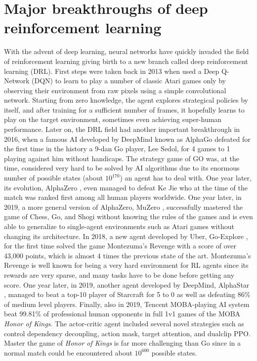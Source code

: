 \section{Major breakthroughs of deep reinforcement learning}
With the advent of deep learning, neural networks have quickly invaded the field of reinforcement learning giving birth to a new branch called deep reinforcement learning (DRL). First steps were taken back in 2013 when \cite{mnih2013playing} used a Deep Q-Network (DQN) to learn to play a number of classic Atari games only by observing their environment from raw pixels using a simple convolutional network. Starting from zero knowledge, the agent explores strategical policies by itself, and after training for a sufficient number of frames, it hopefully learns to play on the target environment, sometimes even achieving super-human performance. Later on, the DRL field had another important breakthrough in 2016, when a famous AI developed by DeepMind known as AlphaGo \cite{alphago} defeated for the first time in the history a 9-dan Go player, Lee Sedol, for 4 games to 1 playing against him without handicaps. The strategy game of GO was, at the time, considered very hard to be solved by AI algorithms due to its enormous number of possible states (about \(10^{170}\)) an agent has to deal with. One year later, its evolution, AlphaZero \cite{silver2017mastering}, even managed to defeat Ke Jie who at the time of the match was ranked first among all human players worldwide. One year later, in 2019, a more general version of AlphaZero, MuZero \cite{Schrittwieser_2020}, successfully mastered the game of Chess, Go, and Shogi without knowing the rules of the games and is even able to generalize to single-agent environments such as Atari games without changing its architecture. In 2018, a new agent developed by Uber, Go-Explore \cite{ecoffet2019goexplore}, for the first time solved the game Montezuma’s Revenge with a score of over 43,000 points, which is almost 4 times the previous state of the art. Montezuma’s Revenge is well known for being a very hard environment for RL agents since its rewards are very sparse, and many tasks have to be done before getting any score. One year later, in 2019, another agent developed by DeepMind, AlphaStar \cite{Arulkumaran_2019}, managed to beat a top-10 player of Starcraft for 5 to 0 as well as defeating 86\% of medium level players. Finally, also in 2019, Tencent MOBA-playing AI system \cite{ye2019mastering} beat 99.81\% of professional human opponents in full 1v1 games of the MOBA \textit{Honor of Kings}. The actor-critic agent included several novel strategies such as control dependency decoupling, action mask, target attention, and dualclip PPO. Master the game of \textit{Honor of Kings} is far more challenging than Go since in a normal match could be encountered about \(10^{600}\) possible states.

